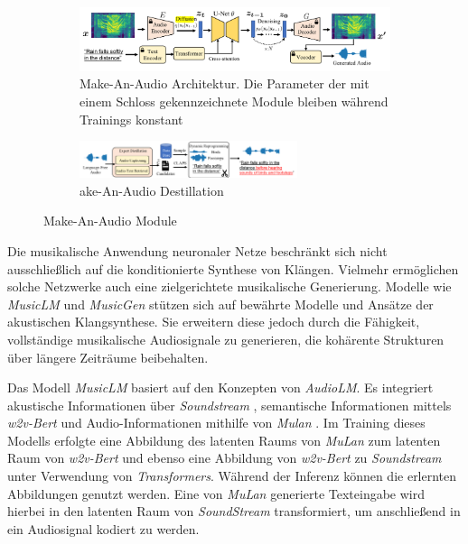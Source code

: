 \documentclass[
  a4paper,  %
  twoside,  %
  bibliography=totoc,
  headsepline,
  cleardoublepage=empty,
  parskip=half,
  draft=false
]{scrbook}
\begin{document}
\begin{figure}[h]
\centering
\begin{subfigure}{1.0\textwidth}
  \centering
  \includegraphics[width=1\textwidth]{graphics/Make-An_Audio.png}
  \caption[Make-An-Audio Architektur]{Make-An-Audio Architektur\cite{huang_make--audio_2023}. Die Parameter der mit einem Schloss gekennzeichnete Module bleiben während Trainings konstant}
  \label{fig:Make-An-Audio_Architecture}
\end{subfigure}

\vspace{1em} %

\begin{subfigure}{1.0\textwidth}
  \centering
  \includegraphics[width=0.7\textwidth]{graphics/Make-An-Audio-Destillation.png}
  \caption[Make-An-Audio Destillation]{ake-An-Audio Destillation \cite{huang_make--audio_2023}}
  \label{fig:Make-An-Audio_DestillATIon}
\end{subfigure}
\caption[Make-An-Audio Module]{Make-An-Audio Module}
\label{fig:test}
\end{figure}

Die musikalische Anwendung neuronaler Netze beschränkt sich nicht ausschließlich auf die konditionierte Synthese von Klängen. Vielmehr ermöglichen solche Netzwerke auch eine zielgerichtete musikalische Generierung. Modelle wie \emph{MusicLM} \cite{agostinelli_musiclm_2023} und \emph{MusicGen} \cite{copet_simple_2023} stützen sich auf bewährte Modelle und Ansätze der akustischen Klangsynthese. Sie erweitern diese jedoch durch die Fähigkeit, vollständige musikalische Audiosignale zu generieren, die kohärente Strukturen über längere Zeiträume beibehalten. 

Das Modell \emph{MusicLM} basiert auf den Konzepten von \emph{AudioLM}. Es integriert akustische Informationen über \emph{Soundstream} \cite{zeghidour_soundstream_2021}, semantische Informationen mittels \emph{w2v-Bert} \cite{chung_w2v-bert_2021-1} und Audio-Informationen mithilfe von \emph{Mulan} \cite{huang_mulan_2022}. Im Training dieses Modells erfolgte eine Abbildung des latenten Raums von \emph{MuLan} zum latenten Raum von \emph{w2v-Bert} und ebenso eine Abbildung von \emph{w2v-Bert} zu \emph{Soundstream} unter Verwendung von \emph{Transformers}. Während der Inferenz können die erlernten Abbildungen genutzt werden. Eine von \emph{MuLan} generierte Texteingabe wird hierbei in den latenten Raum von \emph{SoundStream} transformiert, um anschließend in ein Audiosignal kodiert zu werden. \cite{agostinelli_musiclm_2023}
\end{document}
